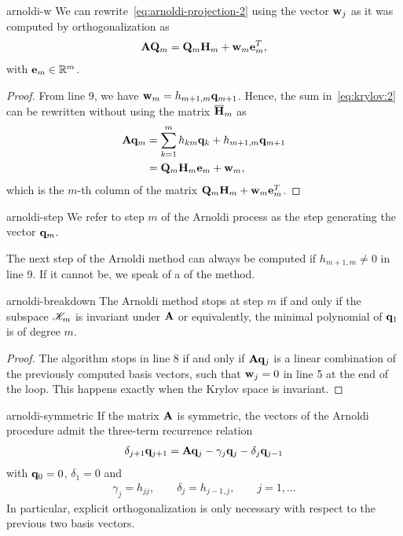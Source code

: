 \begin{Lemma}{arnoldi-w}
  We can rewrite~\eqref{eq:arnoldi-projection-2} using the vector
  $\mathbf w_j$ as it was computed by orthogonalization as
  \begin{gather}
    \label{eq:arnoldi-projection-1}
    \mathbf A\mathbf Q_m
    = \mathbf Q_m\mathbf H_m+\mathbf w_m\mathbf e_m^T,
  \end{gather}
  with $\mathbf e_m\in \mathbb R^m$.
\end{Lemma}

\begin{proof}
  From line 9, we have $\mathbf w_m = h_{m+1,m} \mathbf q_{m+1}$. Hence, the sum
  in~\eqref{eq:krylov:2} can be rewritten without using the matrix
  $\overline{\mathbf H}_m$ as
  \begin{align}
    \mathbf A\mathbf q_m
    &= \sum_{k=1}^{m} h_{km}\mathbf q_k + h_{m+1,m} \mathbf q_{m+1}\\
    &= \mathbf Q_m\mathbf H_m \mathbf e_m + \mathbf w_m,
  \end{align}
  which is the $m$-th column of the matrix $\mathbf Q_m\mathbf H_m+\mathbf w_m\mathbf e_m^T$.
\end{proof}  

\begin{Notation}{arnoldi-step}
  We refer to step $m$ of the Arnoldi process as the step generating
  the vector $\mathbf q_m$.
\end{Notation}

\begin{remark}
  The next step of the Arnoldi method can always be computed if
  $h_{m+1,m}\neq 0$ in line 9. If it cannot be, we speak of a
   of the method.
\end{remark}

\begin{Lemma}{arnoldi-breakdown}
  The Arnoldi method stops at step $m$ if and only if the subspace
  $\mathscr K_m$ is invariant under $\mathbf A$ or equivalently, the minimal
  polynomial of $\mathbf q_1$ is of degree $m$.
\end{Lemma}

\begin{proof}
  The algorithm stops in line 8 if and only if $\mathbf A\mathbf q_j$ is a
  linear combination of the previously computed basis vectors, such
  that $\mathbf w_j=0$ in line 5 at the end of the loop. This happens
  exactly when the Krylov space is invariant.
\end{proof}

\begin{Lemma}{arnoldi-symmetric}
  If the matrix $\mathbf A$ is symmetric, the vectors of the Arnoldi
  procedure admit the three-term recurrence relation
  \begin{gather}
    \delta_{j+1}\mathbf q_{j+1} = \mathbf A \mathbf q_j - \gamma_j \mathbf q_j - \delta_j\mathbf q_{j-1}
  \end{gather}
  with $\mathbf q_0 = 0$, $\delta_1 = 0$ and
  \begin{gather}
    \gamma_j =  h_{jj}, \qquad \delta_j = h_{j-1,j},
    \qquad j=1,\dots
  \end{gather}
  In particular, explicit orthogonalization is only necessary with respect to
  the previous two basis vectors.
\end{Lemma}

